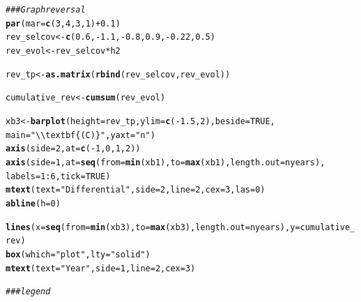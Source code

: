 \documentclass{article}\usepackage[]{graphicx}\usepackage[]{color}
\makeatletter
\newcommand{\hlnum}[1]{\textcolor[rgb]{0.686,0.059,0.569}{#1}}%
\newcommand{\hlstr}[1]{\textcolor[rgb]{0.192,0.494,0.8}{#1}}%
\newcommand{\hlcom}[1]{\textcolor[rgb]{0.678,0.584,0.686}{\textit{#1}}}%
\newcommand{\hlopt}[1]{\textcolor[rgb]{0,0,0}{#1}}%
\newcommand{\hlstd}[1]{\textcolor[rgb]{0.345,0.345,0.345}{#1}}%
\newcommand{\hlkwb}[1]{\textcolor[rgb]{0.69,0.353,0.396}{#1}}%
\newcommand{\hlkwc}[1]{\textcolor[rgb]{0.333,0.667,0.333}{#1}}%
\newcommand{\hlkwd}[1]{\textcolor[rgb]{0.737,0.353,0.396}{\textbf{#1}}}%
\newenvironment{kframe}{%
 \def\at@end@of@kframe{}%
 \ifinner\ifhmode%
  \def\at@end@of@kframe{\end{minipage}}%
  \begin{minipage}{\columnwidth}%
 \fi\fi%
 \def\FrameCommand##1{\hskip\@totalleftmargin \hskip-\fboxsep
 \colorbox{shadecolor}{##1}\hskip-\fboxsep
     \hskip-\linewidth \hskip-\@totalleftmargin \hskip\columnwidth}%
 \MakeFramed {\advance\hsize-\width
   \@totalleftmargin\z@ \linewidth\hsize
   \@setminipage}}%
 {\par\unskip\endMakeFramed%
 \at@end@of@kframe}
\newenvironment{knitrout}{}{} %
\makeatother
\begin{document}
\begin{knitrout}
\begin{kframe}
\begin{alltt}
\hlcom{### Graph reversal}
\hlkwd{par}\hlstd{(}\hlkwc{mar}\hlstd{=}\hlkwd{c}\hlstd{(}\hlnum{3}\hlstd{,} \hlnum{4}\hlstd{,} \hlnum{3}\hlstd{,}\hlnum{1}\hlstd{)} \hlopt{+} \hlnum{0.1}\hlstd{)}
\hlstd{rev_selcov} \hlkwb{<-} \hlkwd{c}\hlstd{(}\hlnum{0.6}\hlstd{,}\hlopt{-}\hlnum{1.1}\hlstd{,}\hlopt{-}\hlnum{0.8}\hlstd{,}\hlnum{0.9}\hlstd{,}\hlopt{-}\hlnum{0.22}\hlstd{,}\hlnum{0.5}\hlstd{)}
\hlstd{rev_evol} \hlkwb{<-} \hlstd{rev_selcov} \hlopt{*} \hlstd{h2}

\hlstd{rev_tp} \hlkwb{<-} \hlkwd{as.matrix}\hlstd{(}\hlkwd{rbind}\hlstd{(rev_selcov, rev_evol))}

\hlstd{cumulative_rev} \hlkwb{<-} \hlkwd{cumsum}\hlstd{(rev_evol)}

\hlstd{xb3} \hlkwb{<-} \hlkwd{barplot}\hlstd{(}\hlkwc{height} \hlstd{= rev_tp,} \hlkwc{ylim} \hlstd{=} \hlkwd{c}\hlstd{(}\hlopt{-}\hlnum{1.5}\hlstd{,}\hlnum{2}\hlstd{),} \hlkwc{beside} \hlstd{=} \hlnum{TRUE}\hlstd{,}
               \hlkwc{main}\hlstd{=}\hlstr{"\textbackslash{}\textbackslash{}textbf\{(C)\}"}\hlstd{,} \hlkwc{yaxt}\hlstd{=}\hlstr{"n"}\hlstd{)}
\hlkwd{axis}\hlstd{(}\hlkwc{side}\hlstd{=}\hlnum{2}\hlstd{,} \hlkwc{at} \hlstd{=} \hlkwd{c}\hlstd{(}\hlopt{-}\hlnum{1}\hlstd{,}\hlnum{0}\hlstd{,}\hlnum{1}\hlstd{,}\hlnum{2}\hlstd{))}
\hlkwd{axis}\hlstd{(}\hlkwc{side}\hlstd{=}\hlnum{1}\hlstd{,} \hlkwc{at} \hlstd{=} \hlkwd{seq}\hlstd{(}\hlkwc{from}\hlstd{=}\hlkwd{min}\hlstd{(xb1),} \hlkwc{to}\hlstd{=}\hlkwd{max}\hlstd{(xb1),} \hlkwc{length.out} \hlstd{= nyears),}
     \hlkwc{labels} \hlstd{=} \hlnum{1}\hlopt{:}\hlnum{6}\hlstd{,}\hlkwc{tick} \hlstd{=} \hlnum{TRUE}\hlstd{)}
\hlkwd{mtext}\hlstd{(}\hlkwc{text} \hlstd{=} \hlstr{"Differential"}\hlstd{,} \hlkwc{side} \hlstd{=} \hlnum{2}\hlstd{,} \hlkwc{line} \hlstd{=} \hlnum{2}\hlstd{,} \hlkwc{cex}\hlstd{=}\hlnum{3}\hlstd{,} \hlkwc{las}\hlstd{=}\hlnum{0}\hlstd{)}
\hlkwd{abline}\hlstd{(}\hlkwc{h}\hlstd{=}\hlnum{0}\hlstd{)}

\hlkwd{lines}\hlstd{(}\hlkwc{x}\hlstd{=}\hlkwd{seq}\hlstd{(}\hlkwc{from}\hlstd{=}\hlkwd{min}\hlstd{(xb3),} \hlkwc{to}\hlstd{=}\hlkwd{max}\hlstd{(xb3),} \hlkwc{length.out} \hlstd{= nyears),} \hlkwc{y}\hlstd{=cumulative_rev)}
\hlkwd{box}\hlstd{(}\hlkwc{which} \hlstd{=} \hlstr{"plot"}\hlstd{,} \hlkwc{lty} \hlstd{=} \hlstr{"solid"}\hlstd{)}
\hlkwd{mtext}\hlstd{(}\hlkwc{text} \hlstd{=} \hlstr{"Year"}\hlstd{,} \hlkwc{side} \hlstd{=} \hlnum{1}\hlstd{,} \hlkwc{line} \hlstd{=} \hlnum{2}\hlstd{,} \hlkwc{cex}\hlstd{=}\hlnum{3}\hlstd{)}

\hlcom{### legend}



\end{alltt}
\end{kframe}
\end{knitrout}
\end{document}
